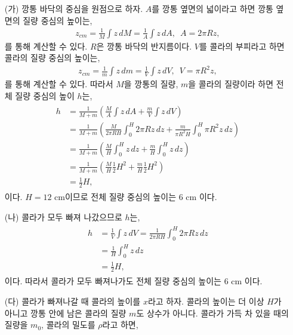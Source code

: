 \documentclass[floatfix,nofootinbib,superscriptaddress,fleqn]{revtex4-2}
\begin{document}
\begin{itemize}
  \item[(가)] 깡통 바닥의 중심을 원점으로 하자. $A$를 깡통 옆면의 넓이라고 하면 
  깡통 옆면의 질량 중심의 높이는,
  \begin{align}
    z_{cm} =\frac{1}{M}\int z\,dM=\frac{1}{A}\int z\,dA,\,\,\, A =2\pi R z,
  \end{align}
  를 통해 계산할 수 있다. $R$은 깡통 바닥의 반지름이다.
   $V$를 콜라의 부피라고 하면 콜라의 질량 중심의 높이는,
  \begin{align}
    z_{cm} =\frac{1}{m}\int z\,dm=\frac{1}{V}\int z\,dV,\,\,\,V=\pi R^2 z,
  \end{align}
  를 통해 계산할 수 있다. 따라서 $M$을 깡통의 질량, $m$을 콜라의 질량이라 하면 
  전체 질량 중심의 높이 $h$는,
  \begin{align}
    \begin{split}
      h &= \frac{1}{M+m}\left(\frac{M}{A}\int z\,dA
      +\frac{m}{V}\int z\,dV\right) \\
       &= \frac{1}{M+m}\left(\frac{M}{2\pi R H}\int_0^H 2\pi R z\,dz
      +\frac{m}{\pi R^2 H}\int_0^H\pi R^2 z\,dz\right)  \\
      &= \frac{1}{M+m}\left(\frac{M}{H}\int_0^H z\,dz
      +\frac{m}{H}\int_0^H z\,dz\right) \\
      &= \frac{1}{M+m}\left(
        \frac{M}{H}\frac{1}{2}H^2
        +\frac{m}{H}\frac{1}{2}H^2
      \right)  \\
      &=\frac{1}{2}H,
    \end{split}
  \end{align}
  이다. $H=12$ cm이므로 전체 질량 중심의 높이는 6 cm 이다.
  \item[(나)] 콜라가 모두 빠져 나갔으므로 $h$는,
  \begin{align}
    \begin{split}
      h&=\frac{1}{V}\int z\,dV 
      = \frac{1}{2\pi R H}\int_0^H 2\pi R z\,dz \\
      &=\frac{1}{H}\int_0^H z\,dz \\
      &=\frac{1}{2}H,
    \end{split}
  \end{align}
  이다. 따라서 콜라가 모두 빠져나가도 전체 질량 중심의 높이는 6 cm 이다.
  \item[(다)] 콜라가 빠져나갈 때 콜라의 높이를 $x$라고 하자. 콜라의 높이는 
  더 이상 $H$가 아니고 깡통 안에 남은 콜라의 질량 $m$도 상수가 아니다. 콜라가 
  가득 차 있을 때의 질량을 $m_0$,
  콜라의 밀도를 $\rho$라고 하면,
  \begin{align}

\end{align}
\end{itemize}
\end{document}

